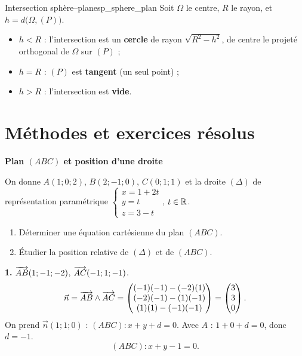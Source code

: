 \begin{propriete}{Intersection sphère–plan}{esp_sphere_plan}
	Soit $\Omega$ le centre, $R$ le rayon, et $h = d\bigl(\Omega,(P)\bigr)$.
	\begin{itemize}[label=\textbullet]
		\item $h < R$ : l'intersection est un \textbf{cercle} de rayon
		$\sqrt{R^2 - h^2}$, de centre le projeté orthogonal de $\Omega$ sur $(P)$ ;
		\item $h = R$ : $(P)$ est \textbf{tangent} (un seul point) ;
		\item $h > R$ : l'intersection est \textbf{vide}.
	\end{itemize}
\end{propriete}


\section{Méthodes et exercices résolus}

\exerciceresolu
\textbf{Plan $(ABC)$ et position d'une droite}

On donne $A(1;0;2)$, $B(2;-1;0)$, $C(0;1;1)$ et la droite $(\Delta)$ de
représentation paramétrique
$\begin{cases} x = 1 + 2t \\ y = t \\ z = 3 - t \end{cases}$, $t \in \mathbb{R}$.
\begin{enumerate}
	\item Déterminer une équation cartésienne du plan $(ABC)$.
	\item Étudier la position relative de $(\Delta)$ et de $(ABC)$.
\end{enumerate}

\solution

\textbf{1.} $\overrightarrow{AB}(1;-1;-2)$, $\overrightarrow{AC}(-1;1;-1)$.
$$
\vec n = \overrightarrow{AB} \wedge \overrightarrow{AC} =
\begin{pmatrix}
	(-1)(-1) - (-2)(1) \\
	(-2)(-1) - (1)(-1) \\
	(1)(1) - (-1)(-1)
\end{pmatrix}
= \begin{pmatrix} 3 \\ 3 \\ 0 \end{pmatrix}.
$$
On prend $\vec n(1;1;0)$ : $(ABC) : x + y + d = 0$. Avec $A$ : $1 + 0 + d = 0$,
donc $d = -1$.
$$
\boxed{(ABC) : x + y - 1 = 0.}
$$

